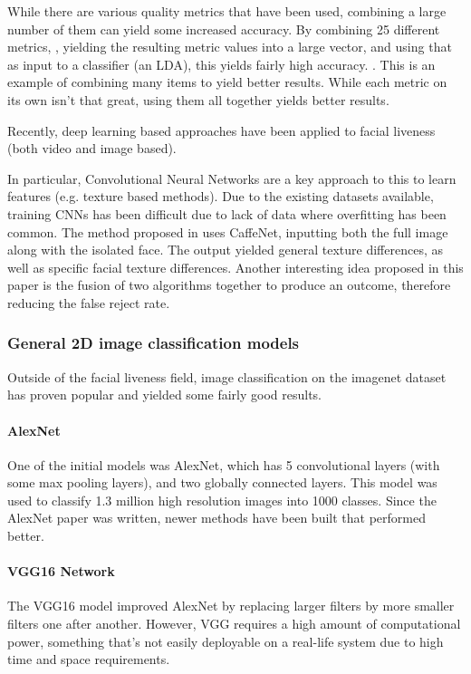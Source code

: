 \documentclass[10pt,a4paper]{article}
\begin{document}
        While there are various quality metrics that have been used, combining a large number of them can yield some increased accuracy. By combining 25 different metrics,
        , yielding the resulting metric values into a large vector, and using that as input to a classifier (an LDA), this yields fairly high accuracy. \cite{ImageQualityAssessmentTest}.
        This is an example of combining many items to yield better results. While each metric on its own isn't that great, using them all together yields better results.
        
        Recently, deep learning based approaches have been applied to facial liveness (both video and image based).

        In particular, Convolutional Neural Networks are a key approach to this to learn features (e.g. texture based methods).
        Due to the existing datasets available, training CNNs has been difficult due to lack of data where overfitting has been common.
        The method proposed in \cite{Patel2016CrossDatabaseFA} uses CaffeNet, inputting both the full image along with the isolated face.
        The output yielded general texture differences, as well as specific facial texture differences. Another interesting idea proposed
        in this paper is the fusion of two algorithms together to produce an outcome, therefore reducing the false reject rate.
        
        \subsubsection{General 2D image classification models}
        Outside of the facial liveness field, image classification on the imagenet dataset has proven popular and yielded some fairly good
        results. 
        
        \paragraph{AlexNet} 
        One of the initial models was AlexNet, which has 5 convolutional layers (with some max pooling layers), and two globally connected layers.
        This model was used to classify 1.3 million high resolution images into 1000 classes. \cite{AlexNet} Since the AlexNet paper was written,
        newer methods have been built that performed better. 
        
        \paragraph{VGG16 Network}
        The VGG16 model improved AlexNet by replacing larger filters by more smaller filters one after another.
        However, VGG requires a high amount of computational power, something that's not easily deployable  on a real-life system
        due to high time and space requirements. 
        
\end{document}
